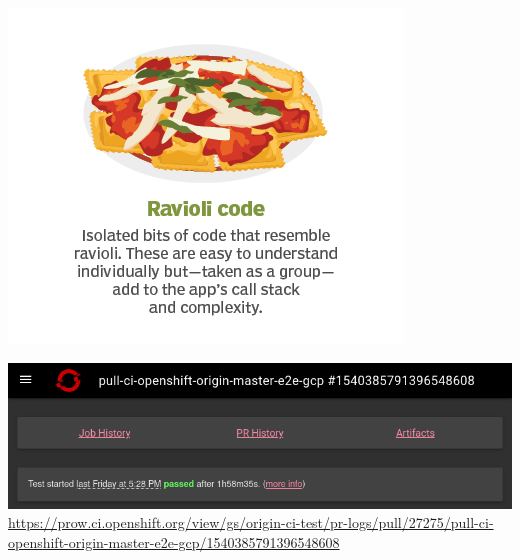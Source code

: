 \begin{frame}
    \autotitle
    \begin{center}
        \includegraphics[scale=.5]{img/ravioli.png}
    \end{center}
\end{frame}

\begin{frame}
    \autotitle
    \begin{center}
        \includegraphics[width=\textwidth]{../ci-operator/img/job.png}
        \footnotesize
        \url{https://prow.ci.openshift.org/view/gs/origin-ci-test/pr-logs/pull/27275/pull-ci-openshift-origin-master-e2e-gcp/1540385791396548608}
    \end{center}
\end{frame}

